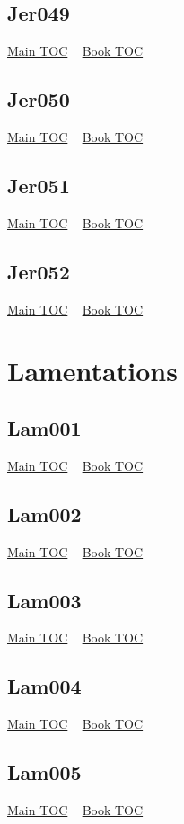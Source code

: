 \documentclass{book}
\begin{document}
  \section{Jer049}\hyperlink{toc}{Main TOC} ~ \hyperref[subsec:Jer]{Book TOC} 
  \section{Jer050}\hyperlink{toc}{Main TOC} ~ \hyperref[subsec:Jer]{Book TOC} 
  \section{Jer051}\hyperlink{toc}{Main TOC} ~ \hyperref[subsec:Jer]{Book TOC} 
  \section{Jer052}\hyperlink{toc}{Main TOC} ~ \hyperref[subsec:Jer]{Book TOC} 
  \chapter{Lamentations} \label{subsec:Lam} \begin{multicols}{2} \minitoc \end{multicols}
  \section{Lam001}\hyperlink{toc}{Main TOC} ~ \hyperref[subsec:Lam]{Book TOC} 
  \section{Lam002}\hyperlink{toc}{Main TOC} ~ \hyperref[subsec:Lam]{Book TOC} 
  \section{Lam003}\hyperlink{toc}{Main TOC} ~ \hyperref[subsec:Lam]{Book TOC} 
  \section{Lam004}\hyperlink{toc}{Main TOC} ~ \hyperref[subsec:Lam]{Book TOC} 
  \section{Lam005}\hyperlink{toc}{Main TOC} ~ \hyperref[subsec:Lam]{Book TOC} 
\end{document}
